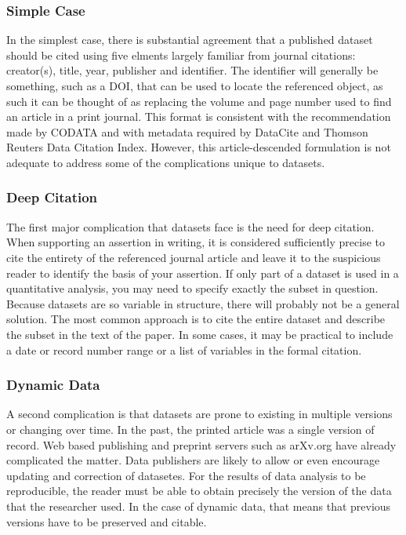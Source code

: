 \documentclass{article}
\begin{document}
\subsubsection{Simple Case}\label{simple-case}

In the simplest case, there is substantial agreement that a published dataset should be cited using five elments largely familiar from journal citations: creator(s), title, year, publisher and identifier.
The identifier will generally be something, such as a DOI, that can be used to locate the referenced object, as such it can be thought of as replacing the volume and page number used to find an article in a print journal.
This format is consistent with the recommendation made by CODATA and with metadata required by DataCite and Thomson Reuters Data Citation Index.
However, this article-descended formulation is not adequate to address some of the complications unique to datasets.

\subsubsection{Deep Citation}\label{deep-citation}

The first major complication that datasets face is the need for deep citation.
When supporting an assertion in writing, it is considered sufficiently precise to cite the entirety of the referenced journal article and leave it to the suspicious reader to identify the basis of your assertion.
If only part of a dataset is used in a quantitative analysis, you may need to specify exactly the subset in question.
Because datasets are so variable in structure, there will probably not be a general solution.
The most common approach is to cite the entire dataset and describe the subset in the text of the paper.
In some cases, it may be practical to include a date or record number range or a list of variables in the formal citation.

\subsubsection{Dynamic Data}\label{dynamic-data}

A second complication is that datasets are prone to existing in multiple versions or changing over time.
In the past, the printed article was a single version of record.
Web based publishing and preprint servers such as arXv.org have already complicated the matter.
Data publishers are likely to allow or even encourage updating and correction of datasetes.
For the results of data analysis to be reproducible, the reader must be able to obtain precisely the version of the data that the researcher used.
In the case of dynamic data, that means that previous versions have to be preserved and citable.
\end{document}
